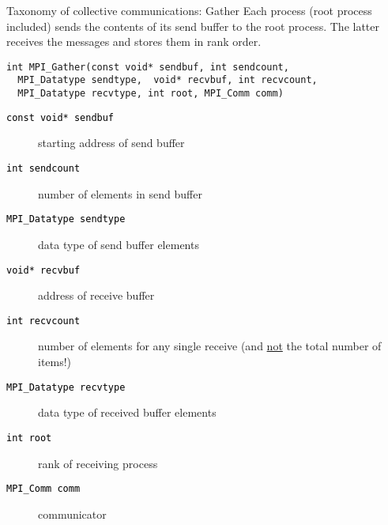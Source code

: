 \documentclass[xcolor={svgnames,usenames}]{beamer}
\begin{document}
\begin{frame}[fragile]{Taxonomy of collective communications: Gather}
\small
Each process (root process included) sends the contents of its send buffer to the root process. The latter receives the messages and stores them in rank order.
\begin{verbatim}
int MPI_Gather(const void* sendbuf, int sendcount, 
  MPI_Datatype sendtype,  void* recvbuf, int recvcount, 
  MPI_Datatype recvtype, int root, MPI_Comm comm)
\end{verbatim}
\begin{description}
\item[\textcolor{black}{\texttt{const void* sendbuf}}] starting address of send buffer
\item[\textcolor{black}{\texttt{int sendcount}}] number of elements in send buffer
\item[\textcolor{black}{\texttt{MPI_Datatype sendtype}}] data type of send buffer elements
\item[\textcolor{black}{\texttt{void* recvbuf}}] \alert<2>{address of receive buffer}
\item[\textcolor{black}{\texttt{int recvcount}}] \alert<2>{number of elements for any single receive} (and \underline{not} the total number of items!)
\item[\textcolor{black}{\texttt{MPI_Datatype recvtype}}] \alert<2>{data type of received buffer elements}
\item[\textcolor{black}{\texttt{int root}}] rank of receiving process
\item[\textcolor{black}{\texttt{MPI_Comm comm}}] communicator
\end{description}
\end{frame}
\end{document}
